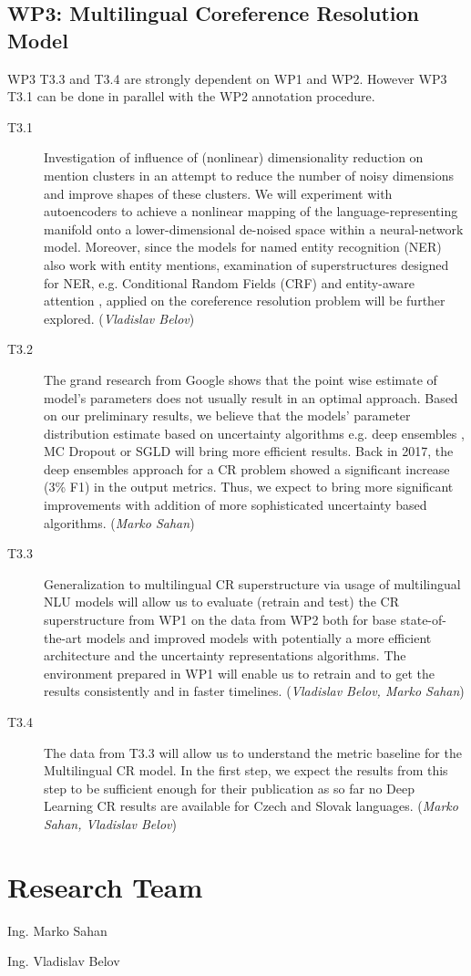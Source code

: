 \subsection*{WP3: Multilingual Coreference Resolution Model}

WP3 T3.3 and T3.4  are strongly dependent on WP1 and WP2. However WP3 T3.1 can be done in parallel with the WP2 annotation procedure.

\begin{description}
	\item [T3.1] Investigation of influence of (nonlinear) dimensionality reduction on mention clusters in an attempt to reduce the number of noisy dimensions and improve shapes of these clusters. We will experiment with autoencoders \cite{autoencoders-Zabalza2016,autoencoders-Sahay2019} to achieve a nonlinear mapping of the language-representing manifold onto a lower-dimensional de-noised space within a neural-network model. Moreover, since the models for named entity recognition (NER) also work with entity mentions, examination of superstructures designed for NER, e.g. Conditional Random Fields (CRF) \cite{ner-Strakova2019,ner-Zhanming2019} and entity-aware attention \cite{ner-Yamada2020}, applied on the coreference resolution problem will be further explored. (\textit{Vladislav Belov})
	\item [T3.2] The grand research from Google \cite{ovadia2019can} shows that the point wise estimate of model’s parameters does not usually result in an optimal approach. Based on our preliminary results, we believe that the models’ parameter distribution estimate based on uncertainty algorithms e.g. deep ensembles \cite{lakshminarayanan2016simple}, MC Dropout \cite{gal2017deep} or SGLD \cite{welling2011bayesian} will bring more efficient results. Back in 2017, the deep ensembles approach for a CR problem \cite{cr-Lee17} showed a significant increase (3\% F1) in the output metrics. Thus, we expect to bring more significant improvements with addition of more sophisticated uncertainty based algorithms. (\textit{Marko Sahan})
	\item [T3.3] Generalization to multilingual CR superstructure via usage of multilingual NLU models will allow us to evaluate (retrain and test) the CR superstructure from WP1 on the data from WP2 both for base state-of-the-art models and improved models with potentially a more efficient architecture and the uncertainty representations algorithms. The environment prepared in WP1 will enable us to retrain and to get the results consistently and in faster timelines. (\textit{Vladislav Belov, Marko Sahan})	
	\item  [T3.4] The data from T3.3 will allow us to understand the metric baseline for the Multilingual CR model. In the first step, we expect the results from this step to be sufficient enough for their publication as so far no Deep Learning CR results are available for Czech and Slovak languages. (\textit{Marko Sahan, Vladislav Belov})

\end{description}


\section{Research Team}\label{sec:research_team}
\begin{description}
	\item Ing. Marko Sahan
	\item Ing. Vladislav Belov
\end{description}
